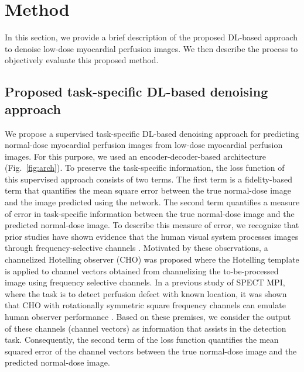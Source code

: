 \documentclass[]{spie}  %
\begin{document}
\section{Method}
\label{sec:method}
In this section, we provide a brief description of the proposed DL-based approach to denoise low-dose myocardial perfusion images. We then describe the process to objectively evaluate this proposed method.

\subsection{Proposed task-specific DL-based denoising approach}
We propose a supervised task-specific DL-based denoising approach for predicting normal-dose myocardial perfusion images from low-dose myocardial perfusion images. For this purpose, we used an encoder-decoder-based architecture (Fig.~\ref{fig:arch}). To preserve the task-specific information, the loss function of this supervised approach consists of two terms. The first term is a fidelity-based term that quantifies the mean square error between the true normal-dose image and the image predicted using the network. The second term quantifies a measure of error in task-specific information between the true normal-dose image and the predicted normal-dose image. To describe this measure of error, we recognize that prior studies have shown evidence that the human visual system processes images through frequency-selective channels \cite{barrett2013foundations}. Motivated by these observations, a channelized Hotelling observer (CHO) was proposed \cite{myers1987addition} where the Hotelling template is applied to channel vectors obtained from channelizing the to-be-processed image using frequency selective channels. In a previous study of SPECT MPI, where the task is to detect perfusion defect with known location, it was shown that CHO with rotationally symmetric square frequency channels can emulate human observer performance \cite{narayanan2001optimization}. Based on these premises, we consider the output of these channels (channel vectors) as information that assists in the detection task. Consequently, the second term of the loss function quantifies the mean squared error of the channel vectors between the true normal-dose image and the predicted normal-dose image.
\end{document}
